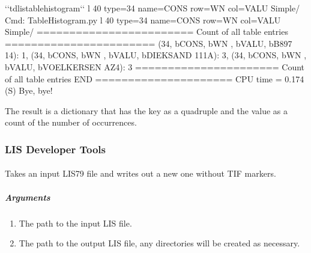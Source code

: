 \documentclass[letterpaper,10pt,english]{sphinxmanual}
\begin{document}
\begin{sphinxVerbatim}[commandchars=\\\{\}]
\PYGZdl{} {}`{}`tdlistablehistogram{}`{}` \PYGZhy{}l 40 \PYGZhy{}\PYGZhy{}type=34 \PYGZhy{}\PYGZhy{}name=CONS \PYGZhy{}\PYGZhy{}row=\PYGZdq{}WN  \PYGZdq{} \PYGZhy{}\PYGZhy{}col=VALU Simple/
Cmd: TableHistogram.py \PYGZhy{}l 40 \PYGZhy{}\PYGZhy{}type=34 \PYGZhy{}\PYGZhy{}name=CONS \PYGZhy{}\PYGZhy{}row=WN   \PYGZhy{}\PYGZhy{}col=VALU Simple/
======================== Count of all table entries =======================
\PYGZob{}\PYGZdq{}(34, b\PYGZsq{}CONS\PYGZsq{}, b\PYGZsq{}WN  \PYGZsq{}, b\PYGZsq{}VALU\PYGZsq{}, b\PYGZsq{}B897 \PYGZhy{} 14\PYGZsq{})\PYGZdq{}: 1,
 \PYGZdq{}(34, b\PYGZsq{}CONS\PYGZsq{}, b\PYGZsq{}WN  \PYGZsq{}, b\PYGZsq{}VALU\PYGZsq{}, b\PYGZsq{}DIEKSAND 111A\PYGZsq{})\PYGZdq{}: 3,
 \PYGZdq{}(34, b\PYGZsq{}CONS\PYGZsq{}, b\PYGZsq{}WN  \PYGZsq{}, b\PYGZsq{}VALU\PYGZsq{}, b\PYGZsq{}VOELKERSEN AZ4\PYGZsq{})\PYGZdq{}: 3\PYGZcb{}
====================== Count of all table entries END =====================
CPU time =    0.174 (S)
Bye, bye!
\end{sphinxVerbatim}

The result is a dictionary that has the key as a quadruple  and
the value as a count of the number of occurrences.


\subsubsection{LIS Developer Tools}
\label{\detokenize{cmd_line_tools/LIS_cmd_line_tools:lis-developer-tools}}

\paragraph{}
\label{\detokenize{cmd_line_tools/LIS_cmd_line_tools:tdlisdetif}}
Takes an input LIS79 file and writes out a new one without TIF markers.


\subparagraph{Arguments}
\label{\detokenize{cmd_line_tools/LIS_cmd_line_tools:id16}}\begin{enumerate}
\item {} 
The path to the input LIS file.

\item {} 
The path to the output LIS file, any directories will be created as necessary.

\end{enumerate}
\end{document}
